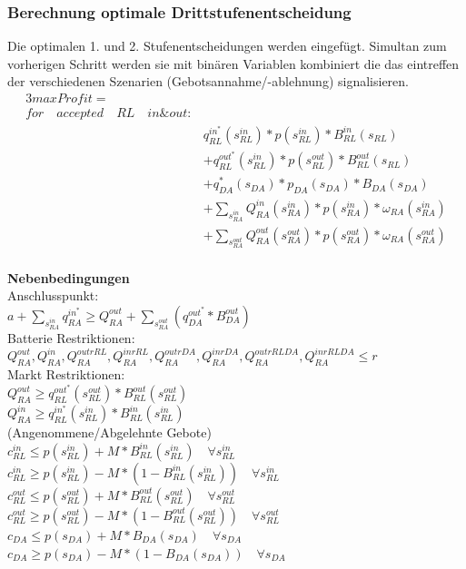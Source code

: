 \documentclass{article}
\begin{document}
\subsubsection{Berechnung optimale Drittstufenentscheidung}
Die optimalen 1. und 2. Stufenentscheidungen werden eingefügt. Simultan zum vorherigen Schritt werden sie mit binären Variablen kombiniert die das eintreffen der verschiedenen Szenarien (Gebotsannahme/-ablehnung) signalisieren.
\begin{alignat*}{3}  
max Profit  =&\\
for\quad accepted\quad RL\quad in \& out:&\\
        &q^{in^*}_{RL} (s^{in}_{RL}) * p(s^{in}_{RL}) * B^{in}_{RL} (s_{RL}) \\
        &+ q^{out^*}_{RL}(s^{in}_{RL}) * p(s^{out}_{RL}) * B^{out}_{RL} (s_{RL})\\    
        &+ q^*_{DA}(s_{DA}) * p_{DA}(s_{DA}) * B_{DA}(s_{DA})\\
	&	+ \sum_{s^{in}_{RA}} Q^{in}_{RA}(s^{in}_{RA}) * p(s^{in}_{RA}) * \omega_{RA}(s^{in}_{RA})  \\
        &   + \sum_{s^{out}_{RA}} Q^{out}_{RA}(s^{out}_{RA}) * p(s^{out}_{RA}) * \omega_{RA}(s^{out}_{RA}) \\
\end{alignat*}





\textbf{Nebenbedingungen}\\
Anschlusspunkt:\\
$a + \sum_{s^{in}_{RA}} q^{in^*}_{RA} \geq Q^{out}_{RA} + \sum_{s^{out}_{RA}}(q^{out^*}_{DA} * B^{out}_{DA})$ \\
Batterie Restriktionen:\\
$Q^{out}_{RA}, Q^{in}_{RA}, Q^{outrRL}_{RA}, Q^{inrRL}_{RA}, Q^{outrDA}_{RA}, Q^{inrDA}_{RA}, Q^{outrRLDA}_{RA}, Q^{inrRLDA}_{RA} \leq r$\\
Markt Restriktionen:\\
$Q^{out}_{RA} \geq q^{out^*}_{RL} (s^{out}_{RL}) * B^{out}_{RL} (s^{out}_{RL}) $\\
$Q^{in}_{RA} \geq q^{in^*}_{RL} (s^{in}_{RL}) * B^{in}_{RL} (s^{in}_{RL}) $\\

(Angenommene/Abgelehnte Gebote)\\
$c^{in}_{RL} \leq p(s^{in}_{RL}) + M * B^{in}_{RL}(s^{in}_{RL})\quad\forall s^{in}_{RL} $ \\
$c^{in}_{RL} \geq p(s^{in}_{RL}) - M * (1 - B^{in}_{RL}(s^{in}_{RL}))\quad\forall s^{in}_{RL} $ \\
$c^{out}_{RL} \leq p(s^{out}_{RL}) + M * B^{out}_{RL}(s^{out}_{RL})\quad\forall s^{out}_{RL} $ \\
$c^{out}_{RL} \geq p(s^{out}_{RL}) - M * (1 - B^{out}_{RL}(s^{out}_{RL}))\quad\forall s^{out}_{RL} $ \\
$c_{DA} \leq p(s_{DA}) + M * B_{DA}(s_{DA})\quad\forall s_{DA} $ \\
$c_{DA} \geq p(s_{DA}) - M * (1 - B_{DA}(s_{DA}))\quad\forall s_{DA} $ \\
\end{document}
